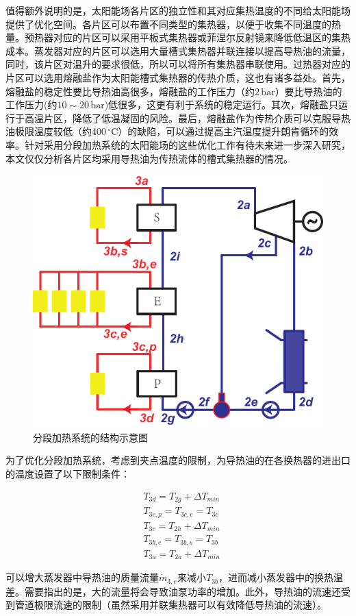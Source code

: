 值得额外说明的是，太阳能场各片区的独立性和其对应集热温度的不同给太阳能场提供了优化空间。各片区可以布置不同类型的集热器，以便于收集不同温度的热量。预热器对应的片区可以采用平板式集热器或菲涅尔反射镜来降低低温区的集热成本。蒸发器对应的片区可以选用大量槽式集热器并联连接以提高导热油的流量，同时，该片区对温升的要求很低，所以可以将所有集热器串联使用。过热器对应的片区可以选用熔融盐作为太阳能槽式集热器的传热介质，这也有诸多益处。首先，熔融盐的稳定性要比导热油高很多，熔融盐的工作压力（约$2\,\mathrm{bar}$）要比导热油的工作压力(约$10\sim20\,\mathrm{bar}$)低很多，这更有利于系统的稳定运行。其次，熔融盐只运行于高温片区，降低了低温凝固的风险。最后，熔融盐作为传热介质可以克服导热油极限温度较低（约400$\,^\circ\mathrm{C}$）的缺陷，可以通过提高主汽温度提升朗肯循环的效率。针对采用分段加热系统的太阳能场的这些优化工作有待未来进一步深入研究，本文仅仅分析各片区均采用导热油为传热流体的槽式集热器的情况。

\noindent \begin{figure}[htbp]
\begin{center}
	\includegraphics[width = 0.5\columnwidth]{fig/SEP}
	\caption{分段加热系统的结构示意图}
	\label{fig:SEP}
\end{center}
\end{figure}

为了优化分段加热系统，考虑到夹点温度的限制，为导热油的在各换热器的进出口的温度设置了以下限制条件：

\begin{eqnarray*}
	&T_{3d} = T_{2g} + \Delta T_{min}\\
   &T_{3c,p} = T_{3c,e} = T_{3c}\\
   &T_{3c} = T_{2h} + \Delta T_{min}\\
	&T_{3b,e} = T_{3b,s} = T_{3b}\\
	&T_{3a} = T_{2a} + \Delta T_{min}
\end{eqnarray*}

可以增大蒸发器中导热油的质量流量$\dot{m}_{3,e}$来减小$T_{3b}$，进而减小蒸发器中的换热温差。需要指出的是，大的流量将会导致油泵功率的增加。此外，导热油的流速还受到管道极限流速的限制（虽然采用并联集热器可以有效降低导热油的流速）。

